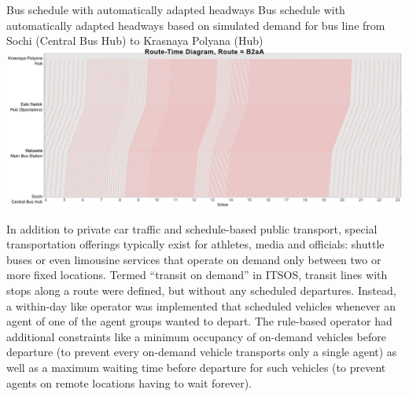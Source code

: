 \createfigure%
{Bus schedule with automatically adapted headways}%
{Bus schedule with automatically adapted headways based on simulated demand for
bus line from Sochi (Central Bus Hub) to Krasnaya Polyana (Hub)}%
{\label{fig:sochi:adaptiveSchedule}}%
{\includegraphics[width=1.\textwidth,angle=0]{./using/figures/sochi_adaptiveSchedule.pdf}}%
{}

In addition to private car traffic and schedule-based public transport, special
transportation offerings typically exist for athletes, media and officials:
shuttle buses or even limousine services that operate on demand only between two
or more fixed locations. Termed ``transit on demand'' in ITSOS, transit lines
with stops along a route were defined, but without any scheduled departures. 
Instead, a within-day like operator was implemented that scheduled vehicles
whenever an agent of one of the agent groups wanted to depart. The
rule-based operator had additional constraints like a minimum occupancy of
on-demand vehicles before departure (to prevent every on-demand vehicle
transports only a single agent) as well as a maximum waiting time before
departure for such vehicles (to prevent agents on remote locations having to
wait forever).

